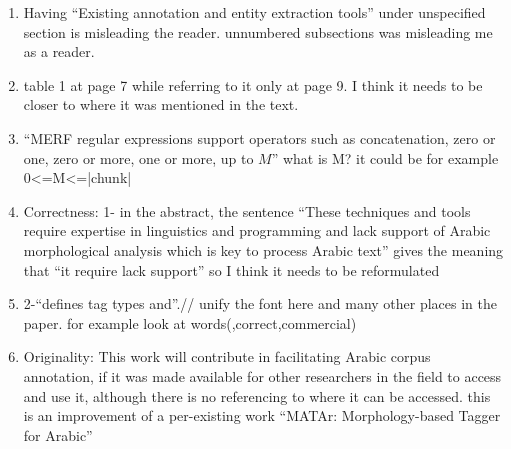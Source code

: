 \begin{enumerate}[leftmargin=0mm,label=\bfseries CommentR3.\arabic*]


\item \label{Review.3.25}
Having ``Existing annotation and entity extraction tools'' 
under unspecified section is misleading the reader. 
unnumbered subsections was misleading me as a reader. 


\item \label{Review.3.25}
table 1 at page 7 while referring to it only at page 9. 
I think it needs to be closer to where it was mentioned in the text. 



\item \label{Review.3.25}
``MERF regular expressions support operators such as concatenation, zero or one, zero or more, one or more, up to $M$” what is M? 
it could be for example 0<=M<=|chunk| 




\item \label{Review.3.25}
Correctness: 
1- in the abstract, the sentence ``These techniques and 
tools require expertise in linguistics and programming and 
lack support of Arabic morphological analysis which is key to 
process Arabic text''
gives the meaning that ``it require lack support'' so I think it 
needs to be reformulated 



\item \label{Review.3.25}
2-``defines tag types and''.// unify the font here and 
many other places in the paper. 
for example look at words(,correct,commercial)


\item \label{Review.3.25}
Originality:  
This work will contribute in facilitating Arabic corpus 
annotation, if it was made available for other researchers in 
the field to access and use it, although there is no 
referencing to where it can be accessed. 
this is an improvement of a per-existing work ``MATAr: Morphology-based Tagger for Arabic''



\end{enumerate}
